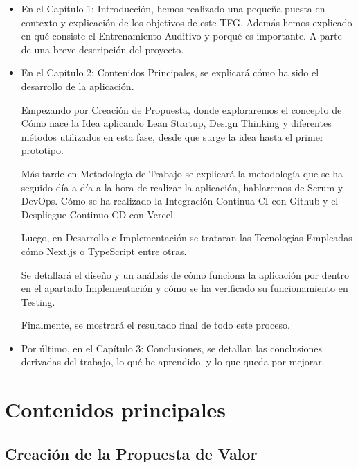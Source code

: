\documentclass[12pt,twoside,titlepage]{report}
\newcommand\blankpage{%
    \newpage
    \null
    \thispagestyle{empty}%
    \newpage}
\begin{document}
\begin{itemize}

    \item En el Capítulo 1: Introducción, hemos realizado una pequeña puesta en contexto y explicación de los objetivos de este TFG. Además hemos explicado en qué consiste el Entrenamiento Auditivo y porqué es importante. A parte de una breve descripción del proyecto.
    \item En el Capítulo 2: Contenidos Principales, se explicará cómo ha sido el desarrollo de la aplicación.
    
    Empezando por Creación de Propuesta, donde exploraremos el concepto de Cómo nace la Idea aplicando Lean Startup, Design Thinking y diferentes métodos utilizados en esta fase, desde que surge la idea hasta el primer prototipo.

    Más tarde en Metodología de Trabajo se explicará la metodología que se ha seguido día a día a la hora de realizar la aplicación, hablaremos de Scrum y DevOps. Cómo se ha realizado la Integración Continua CI con Github y el Despliegue Continuo CD con Vercel.
    
    Luego, en Desarrollo e Implementación se trataran las Tecnologías Empleadas cómo Next.js o TypeScript entre otras. 
    
    Se detallará el diseño y un análisis de cómo funciona la aplicación por dentro en el apartado Implementación y cómo se ha verificado su funcionamiento en Testing. 
    
    Finalmente, se mostrará el resultado final de todo este proceso.
    \item Por último, en el Capítulo 3: Conclusiones, se detallan las conclusiones derivadas del trabajo, lo qué he aprendido, y lo que queda por mejorar.

\end{itemize}



\chapter{Contenidos principales}
\label{chap:contenidos}

\section{Creación de la Propuesta de Valor}
\end{document}
